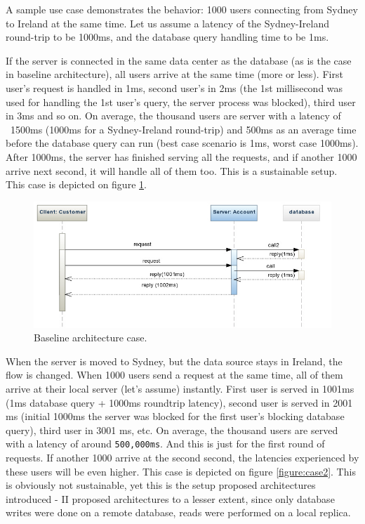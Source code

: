\documentclass{uvamscse}
\begin{document}
A sample use case demonstrates the behavior: 1000 users connecting from Sydney to Ireland at the same time. Let us assume a latency of the Sydney-Ireland round-trip to be 1000ms, and the database query handling time to be 1ms.

If the server is connected in the same data center as the database (as is the case in baseline architecture), all users arrive at the same time (more or less). First user's request is handled in 1ms, second user's in 2ms (the 1st millisecond was used for handling the 1st user's query, the server process was blocked), third user in 3ms and so on. On average, the thousand users are server with a latency of ~1500ms (1000ms for a Sydney-Ireland round-trip) and 500ms as an average time before the database query can run (best case scenario is 1ms, worst case 1000ms). After 1000ms, the server has finished serving all the requests, and if another 1000 arrive next second, it will handle all of them too. This is a sustainable setup. This case is depicted on figure \ref{figure:case1}.

\begin{figure}[H]
\centering
\includegraphics[scale=0.5]{case1}
\caption{Baseline architecture case.}
\label{figure:case1}
\end{figure}

When the server is moved to Sydney, but the data source stays in Ireland, the flow is changed. When 1000 users send a request at the same time, all of them arrive at their local server (let's assume) instantly. First user is served in 1001ms (1ms database query + 1000ms roundtrip latency), second user is served in 2001 ms (initial 1000ms the server was blocked for the first user's blocking database query), third user in 3001 ms, etc. On average, the thousand users are served with a latency of around \texttt{500,000ms}. And this is just for the first round of requests. If another 1000 arrive at the second second, the latencies experienced by these users will be even higher. This case is depicted on figure \ref{figure:case2}. This is obviously not sustainable, yet this is the setup proposed architectures introduced - II proposed architectures to a lesser extent, since only database writes were done on a remote database, reads were performed on a local replica.
\end{document}
